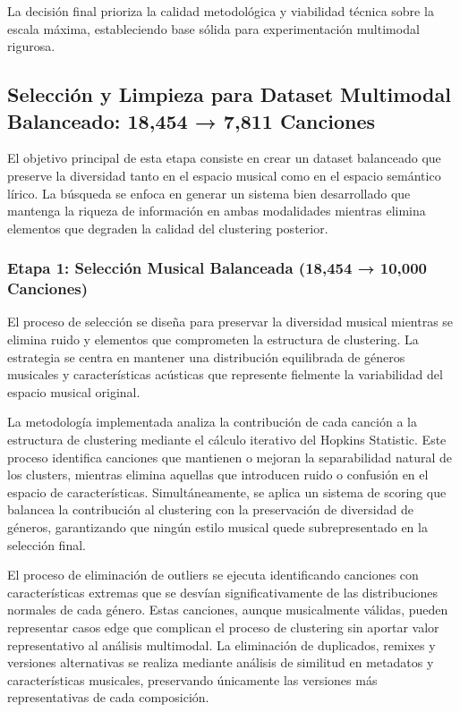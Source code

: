 \documentclass[12pt,a4paper]{report}
\begin{document}
La decisión final prioriza la calidad metodológica y viabilidad técnica sobre la escala máxima, estableciendo base sólida para experimentación multimodal rigurosa.

\subsection{Selección y Limpieza para Dataset Multimodal Balanceado: 18,454 → 7,811 Canciones}

El objetivo principal de esta etapa consiste en crear un dataset balanceado que preserve la diversidad tanto en el espacio musical como en el espacio semántico lírico. La búsqueda se enfoca en generar un sistema bien desarrollado que mantenga la riqueza de información en ambas modalidades mientras elimina elementos que degraden la calidad del clustering posterior.

\subsubsection{Etapa 1: Selección Musical Balanceada (18,454 → 10,000 Canciones)}

El proceso de selección se diseña para preservar la diversidad musical mientras se elimina ruido y elementos que comprometen la estructura de clustering. La estrategia se centra en mantener una distribución equilibrada de géneros musicales y características acústicas que represente fielmente la variabilidad del espacio musical original.

La metodología implementada analiza la contribución de cada canción a la estructura de clustering mediante el cálculo iterativo del Hopkins Statistic. Este proceso identifica canciones que mantienen o mejoran la separabilidad natural de los clusters, mientras elimina aquellas que introducen ruido o confusión en el espacio de características. Simultáneamente, se aplica un sistema de scoring que balancea la contribución al clustering con la preservación de diversidad de géneros, garantizando que ningún estilo musical quede subrepresentado en la selección final.

El proceso de eliminación de outliers se ejecuta identificando canciones con características extremas que se desvían significativamente de las distribuciones normales de cada género. Estas canciones, aunque musicalmente válidas, pueden representar casos edge que complican el proceso de clustering sin aportar valor representativo al análisis multimodal. La eliminación de duplicados, remixes y versiones alternativas se realiza mediante análisis de similitud en metadatos y características musicales, preservando únicamente las versiones más representativas de cada composición.
\end{document}
